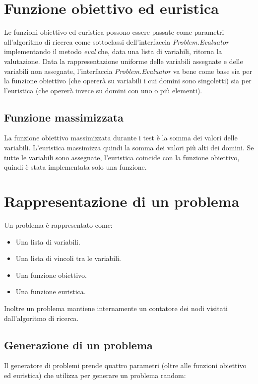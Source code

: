 \documentclass[a4paper,12pt,italian]{article}
\begin{document}
\section{Funzione obiettivo ed euristica}

Le funzioni obiettivo ed euristica possono essere passate come
parametri all'algoritmo di ricerca come sottoclassi dell'interfaccia
\textit{Problem.Evaluator} implementando il metodo \textit{eval} che,
data una lista di variabili, ritorna la valutazione. Data la
rappresentazione uniforme delle variabili assegnate e delle variabili
non assegnate, l'interfaccia \textit{Problem.Evaluator} va bene come
base sia per la funzione obiettivo (che operer\`a su variabili i cui
domini sono singoletti) sia per l'euristica (che operer\`a invece su
domini con uno o pi\`u elementi).

\subsection{Funzione massimizzata}

La funzione obiettivo massimizzata durante i test \`e la somma dei
valori delle variabili. L'euristica massimizza quindi la somma dei
valori pi\`u alti dei domini. Se tutte le variabili sono assegnate,
l'euristica coincide con la funzione obiettivo, quindi \`e stata
implementata solo una funzione.

\section{Rappresentazione di un problema}

Un problema \`e rappresentato come:

\begin{itemize}
\item Una lista di variabili.
\item Una lista di vincoli tra le variabili.
\item Una funzione obiettivo.
\item Una funzione euristica.
\end{itemize}

Inoltre un problema mantiene internamente un contatore dei nodi
visitati dall'algoritmo di ricerca.

\subsection{Generazione di un problema}

Il generatore di problemi prende quattro parametri (oltre alle
funzioni obiettivo ed euristica) che utilizza per generare un problema
random:
\end{document}
